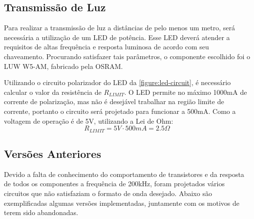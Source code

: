 	\subsection{Transmissão de Luz}
		
	Para realizar a transmissão de luz a distâncias de pelo menos um metro, será necessária a utilização de um LED de potência. Esse LED deverá atender a requisitos de altas frequência e resposta luminosa de acordo com seu chaveamento. Procurando satisfazer tais parâmetros, o componente escolhido foi o LUW W5-AM, fabricado pela OSRAM.

	Utilizando o circuito polarizador do LED da \autoref{figure:led-circuit}, é necessário calcular o valor da resistência de $R_{LIMIT}$. O LED permite no máximo 1000mA de corrente de polarização, mas não é desejável trabalhar na região limite de corrente, portanto o circuito será projetado para funcionar a 500mA. Como a voltagem de operação é de 5V, utilizando a Lei de Ohm:
	\begin{equation}
	R_{LIMIT} = 5V \cdot 500mA = 2.5\Omega
	\end{equation}
	
	\subsection{Versões Anteriores}
	
	Devido a falta de conhecimento do comportamento de transistores e da resposta de todos os componentes a frequência de 200kHz, foram projetados vários circuitos que não satisfaziam o formato de onda desejado. Abaixo são exemplificadas algumas versões implementadas, juntamente com os motivos de terem sido abandonadas.
	
